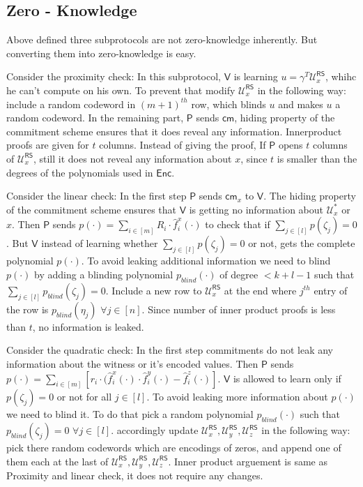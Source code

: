 \documentclass[runningheads]{llncs}
\def\prover{\mathsf{P}}
\def\verifier{\mathsf{V}}
\def\RS{\mathsf{RS}} %
\def\cm{\mathsf{cm}} %
\def\oracle{\mathcal{U}^{\RS}}
\def\enc{\mathsf{Enc}}
\def\calU{\mathcal{U}}
\begin{document}
\subsection{Zero - Knowledge}
	Above defined three subprotocols are not zero-knowledge inherently. But converting them into zero-knowledge is easy. 
	
	Consider the proximity check: In this subprotocol, $\verifier$ is learning $u = \gamma^T\oracle_{x}$, whihc he can't compute on his own. To prevent that modify $\oracle_{x}$ in the following way: include a random codeword in $(m+1)^{th}$ row, which blinds $u$ and makes $u$ a random codeword. 
	In the remaining part, $\prover$ sends $\cm$, hiding property of the commitment scheme ensures that it does reveal any information.
	Innerproduct proofs are given for $t$ columns. Instead of giving the proof, If $\prover$ opens $t$ columns of $\oracle_{x}$, still it does not reveal any information about $x$, since $t$ is smaller than the degrees of the polynomials used in $\enc$.
	
	Consider the linear check: In the first step $\prover$ sends $\cm_x$ to $\verifier$. The hiding property of the commitment scheme ensures that $\verifier$ is getting no information about $\calU^*_x$ or $x$.
	Then $\prover$ sends $p(\cdot) = \sum_{i\in[m]} R_i \cdot \hat{f}^x_i(\cdot)$ to check that if $\sum_{j\in [l]} p(\zeta_j) = 0$. But $\verifier$ instead of learning whether $\sum_{j\in[l]} p(\zeta_j) = 0$ or not, gets the complete polynomial $p(\cdot)$. To avoid leaking additional information we need to blind $p(\cdot)$ by adding a blinding polynomial $p_{blind}(\cdot)$ of degree $< k + l - 1$ such that $\sum_{j\in[l]} p_{blind}(\zeta_j) = 0$. Include a new row to $\oracle_x$ at the end where $j^{th}$ entry of the row is $p_{blind}(\eta_j)$ $\forall j\in [n]$.
	Since number of inner product proofs is less than $t$, no information is leaked.
	
	Consider the quadratic check: In the first step commitments do not leak any information about the witness or it's encoded values.
	Then $\prover$ sends $p(\cdot) = \sum_{i\in[m]} [r_i\cdot (\hat{f}^x_i(\cdot)\cdot \hat{f}^y_i(\cdot) - \hat{f}^z_i(\cdot)]$. $\verifier$ is allowed to learn only if $p(\zeta_j)=0$ or not for all $j\in[l]$. To avoid leaking more information about $p(\cdot)$ we need to blind it. To do that pick a random polynomial $p_{blind}(\cdot)$ such that $p_{blind}(\zeta_j) = 0$ $\forall j\in [l]$. accordingly update $\oracle_x, \oracle_y,\oracle_z$ in the following way: pick there random codewords which are encodings of zeros, and append one of them each at the last of $\oracle_{x}, \oracle_{y}, \oracle_{z}$.
	Inner product arguement is same as Proximity and linear check, it does not require any changes. 
	
	
	
	
	
\end{document}
